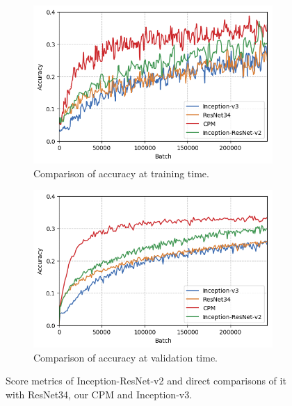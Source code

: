 \begin{figure}
\begin{subfigure}[t]{0.34\textwidth}
        \includegraphics[width=\textwidth]{img/compare_train_acc}
        \vspace*{-.5\baselineskip}
        \caption{Comparison of accuracy at training time.\label{fig:compare_train_acc}}
    \end{subfigure}%
    \enspace
    \begin{subfigure}[t]{0.34\textwidth}
    	\centering
        \includegraphics[width=\textwidth]{img/compare_test_acc}
        \vspace*{-.5\baselineskip}
        \caption{Comparison of accuracy at validation time.\label{fig:compare_test_acc}}
    \end{subfigure}
    \vspace*{-.5\baselineskip}
    \caption{Score metrics of Inception-ResNet-v2 and direct comparisons of it with ResNet34, our CPM and Inception-v3.\label{fig:all_graphs}}
    \vspace*{-.5\baselineskip}
\end{figure} 
 
